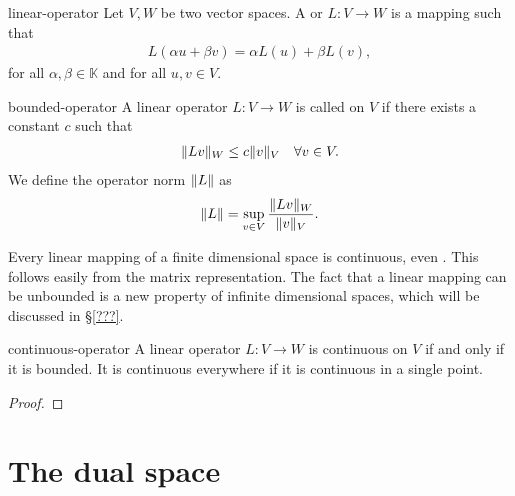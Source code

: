 \begin{Definition}{linear-operator}
  Let $V,W$ be two vector spaces. A  or
   $L\colon V\to W$ is a mapping such that
  \begin{gather*}
    L(\alpha u+\beta v) = \alpha L(u) + \beta L(v),
  \end{gather*}
  for all $\alpha,\beta\in\mathbb K$ and for all $u,v\in V$.
\end{Definition}

\begin{Definition}{bounded-operator}
  A linear operator $L\colon V\to W$ is called  on $V$
  if there exists a constant $c$ such that
  \begin{gather}
    \label{eq:lafa:11}
    \lVert L v\rVert_W \le c \lVert v\rVert_V
    \quad\forall v\in V.
  \end{gather}
  We define the operator norm $\lVert L\rVert$ as
  \begin{gather}
    \label{eq:lafa:12}
    \lVert L\rVert = \sup_{v\in V} \frac{\lVert L v\rVert_W}{\lVert v\rVert_V}.
  \end{gather}
\end{Definition}

\begin{remark}
  Every linear mapping of a finite dimensional space is continuous,
  even . This follows easily from the
  matrix representation. The fact that a linear mapping can be
  unbounded is a new property of infinite dimensional spaces, which
  will be discussed in §\ref{???}.
\end{remark}

\begin{Theorem}{continuous-operator}
  A linear operator $L\colon V\to W$ is continuous on $V$ if and only
  if it is bounded. It is continuous everywhere if it is continuous in
  a single point.
\end{Theorem}

\begin{todo}
  \begin{proof}
    
  \end{proof}
\end{todo}

\section{The dual space}

